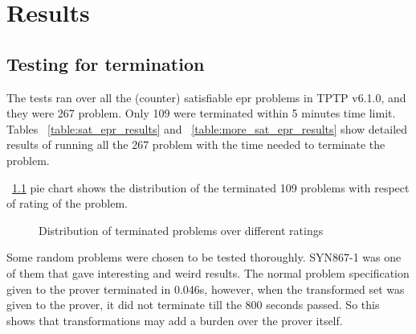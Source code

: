 \chapter{Results}\label{chap:res_and_lit}

\section{Testing for termination}


The tests ran over all the (counter) satisfiable \ac{epr} problems in TPTP v6.1.0, and they were 267 problem. Only 109 were terminated within 5 minutes time limit. Tables ~\ref{table:sat_epr_results} and ~\ref{table:more_sat_epr_results} show detailed results of running all the 267 problem with the time needed to terminate the problem.


~\ref{fig:res_dist} pie chart shows the distribution of the terminated 109 problems with respect of rating of the problem. 


\begin{figure}[H]
\centering
{}
\caption{Distribution of terminated problems over different ratings\label{fig:res_dist}}
\end{figure}

Some random problems were chosen to be tested thoroughly. SYN867-1 was one of them that gave interesting and weird results. The normal problem specification given to the prover terminated in 0.046s, however, when the transformed set was given to the prover, it did not terminate till the 800 seconds passed. So this shows that transformations may add a burden over the prover itself. 




